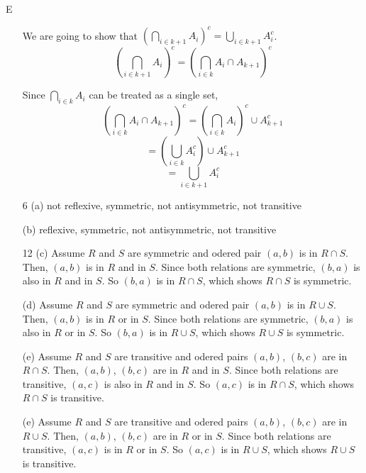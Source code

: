 E\documentclass[a4paper]{article}
\begin{document}
\begin{enumerate}
We are going to show that $(\displaystyle \bigcap_{i\in k+1}  A_{i})^{c} = \displaystyle \bigcup_{i\in k+1} A_{i}^{c}$. 
$$(\displaystyle \bigcap_{i\in k+1}  A_{i})^{c}=(\displaystyle \bigcap_{i\in k}  A_{i} \cap A_{k+1})^{c}$$

Since $\displaystyle \bigcap_{i\in k}  A_{i}$ can be treated as a single set, 
$$(\displaystyle \bigcap_{i\in k}  A_{i} \cap A_{k+1})^{c}=(\displaystyle \bigcap_{i\in k}  A_{i})^{c} \cup A_{k+1}^{c}$$
$$=(\displaystyle\bigcup_{i\in k} A_{i}^{c}) \cup A_{k+1}^{c}$$
$$=\displaystyle \bigcup_{i\in k+1} A_{i}^{c}$$


\item[6]
(a) not reflexive, symmetric, not antisymmetric, not transitive


(b) reflexive, symmetric, not antisymmetric, not transitive

 
\item[12]
(c) Assume $R$ and $S$ are symmetric and odered pair $(a,b)$ is in $R \cap S$. Then, $(a,b)$ is in $R$ and in $S$. Since both relations are symmetric, $(b,a)$ is also in $R$ and in $S$. So $(b,a)$ is in $R \cap S$, which shows $R \cap S$ is symmetric. 

(d) Assume $R$ and $S$ are symmetric and odered pair $(a,b)$ is in $R \cup S$. Then, $(a,b)$ is in $R$ or in $S$. Since both relations are symmetric, $(b,a)$ is also in $R$ or in $S$. So $(b,a)$ is in $R \cup S$, which shows $R \cup S$ is symmetric.

(e) Assume $R$ and $S$ are transitive and odered pairs $(a,b)$, $(b,c)$ are in $R \cap S$. Then, $(a,b)$, $(b,c)$ are in $R$ and in $S$. Since both relations are transitive, $(a,c)$ is also in $R$ and in $S$. So $(a,c)$ is in $R \cap S$, which shows $R \cap S$ is transitive.


(e) Assume $R$ and $S$ are transitive and odered pairs $(a,b)$, $(b,c)$ are in $R \cup S$. Then, $(a,b)$, $(b,c)$ are in $R$ or in $S$. Since both relations are transitive, $(a,c)$ is in $R$ or in $S$. So $(a,c)$ is in $R \cup S$, which shows $R \cup S$ is transitive.


\end{enumerate}
\end{document}

